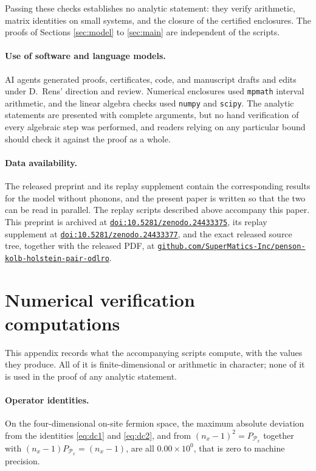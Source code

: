 \documentclass[11pt]{article}
\numberwithin{equation}{section}
\theoremstyle{definition}
\begin{document}
Passing these checks establishes no analytic statement: they verify arithmetic, matrix
identities on small systems, and the closure of the certified enclosures. The proofs of
Sections \ref{sec:model} to \ref{sec:main} are independent of the scripts.

\paragraph{Use of software and language models.}
AI agents generated proofs, certificates, code, and manuscript drafts and edits under
D.~Rens' direction and review. Numerical enclosures used \texttt{mpmath} interval
arithmetic, and the linear algebra checks used \texttt{numpy} and \texttt{scipy}. The
analytic statements are presented with complete arguments, but no hand verification of
every algebraic step was performed, and readers relying on any particular bound should
check it against the proof as a whole.

\paragraph{Data availability.}
The released preprint \cite{rens2026pkodlro} and its replay supplement
\cite{rens2026pkodlrosupp} contain the corresponding results for the model without
phonons, and the present paper is written so that the two can be read in parallel. The
replay scripts described above accompany this paper. This preprint is archived at
\href{https://doi.org/10.5281/zenodo.24433375}{\nolinkurl{doi:10.5281/zenodo.24433375}}, its
replay supplement at
\href{https://doi.org/10.5281/zenodo.24433377}{\nolinkurl{doi:10.5281/zenodo.24433377}}, and
the exact released source tree, together with the released PDF, at
\href{https://github.com/SuperMatics-Inc/penson-kolb-holstein-pair-odlro}{\nolinkurl{github.com/SuperMatics-Inc/penson-kolb-holstein-pair-odlro}}.

\appendix

\section{Numerical verification computations}\label{app:checks}

This appendix records what the accompanying scripts compute, with the values they produce.
All of it is finite-dimensional or arithmetic in character; none of it is used in the
proof of any analytic statement.

\paragraph{Operator identities.}
On the four-dimensional on-site fermion space, the maximum absolute deviation from the
identities \eqref{eq:dc1} and \eqref{eq:dc2}, and from $(n_{x}-1)^{2}=P_{\mathcal{P}_{x}}$ together with
$(n_{x}-1)P_{\mathcal{P}_{x}}=(n_{x}-1)$, are all $0.00\times10^{0}$, that is zero to
machine precision.
\end{document}
